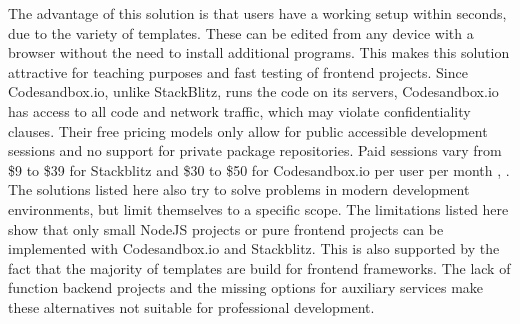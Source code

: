 The advantage of this solution is that users have a working setup within seconds, due to the variety of templates. These can be edited from any device with a browser without the need to install additional programs. This makes this solution attractive for teaching purposes and fast testing of frontend projects. Since Codesandbox.io, unlike StackBlitz, runs the code on its servers, Codesandbox.io has access to all code and network traffic, which may violate confidentiality clauses. Their free pricing models only allow for public accessible development sessions and no support for private package repositories. Paid sessions vary from \$9 to \$39 for Stackblitz and \$30 to \$50 for Codesandbox.io per user per month \cite{stackblitz}, \cite{codesandbox}. \newline
The solutions listed here also try to solve problems in modern development environments, but limit themselves to a specific scope. The limitations listed here show that only small NodeJS projects or pure frontend projects can be implemented with Codesandbox.io and Stackblitz. This is also supported by the fact that the majority of templates are build for frontend frameworks. The lack of function backend projects and the missing options for auxiliary services make these alternatives not suitable for professional development.


